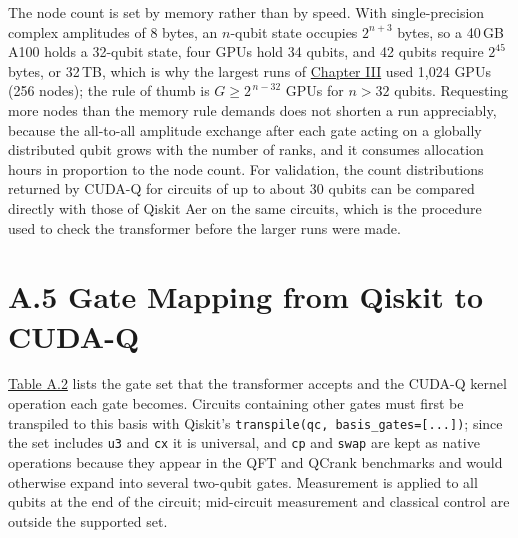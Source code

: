 \documentclass{report}
\theoremstyle{plain}
\theoremstyle{definition}
\theoremstyle{remark}
\begin{document}
The node count is set by memory rather than by speed. With single-precision complex amplitudes of 8 bytes, an $n$-qubit state occupies $2^{n+3}$ bytes, so a 40\,GB A100 holds a 32-qubit state, four GPUs hold 34 qubits, and 42 qubits require $2^{45}$ bytes, or 32\,TB, which is why the largest runs of \hyperref[ch:qgear]{Chapter III} used 1,024 GPUs (256 nodes); the rule of thumb is $G \geq 2^{\,n-32}$ GPUs for $n>32$ qubits. Requesting more nodes than the memory rule demands does not shorten a run appreciably, because the all-to-all amplitude exchange after each gate acting on a globally distributed qubit grows with the number of ranks, and it consumes allocation hours in proportion to the node count. For validation, the count distributions returned by CUDA-Q for circuits of up to about 30 qubits can be compared directly with those of Qiskit Aer on the same circuits, which is the procedure used to check the transformer before the larger runs were made.

\section{A.5 Gate Mapping from Qiskit to CUDA-Q}\label{sec:appqgear:gates}

\hyperref[tab:appqgear:gates]{Table A.2} lists the gate set that the transformer accepts and the CUDA-Q kernel operation each gate becomes. Circuits containing other gates must first be transpiled to this basis with Qiskit's \texttt{transpile(qc, basis\_gates=[...])}; since the set includes \texttt{u3} and \texttt{cx} it is universal, and \texttt{cp} and \texttt{swap} are kept as native operations because they appear in the QFT and QCrank benchmarks and would otherwise expand into several two-qubit gates. Measurement is applied to all qubits at the end of the circuit; mid-circuit measurement and classical control are outside the supported set.
\end{document}
